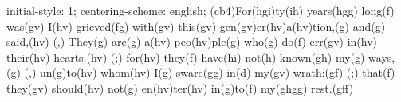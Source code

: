 initial-style: 1;
centering-scheme: english;
(cb4)For(hgi)ty(ih) years(hgg) long(f) was(gv) I(hv) grieved(fg) with(gv) this(gv) gen(gv)er(hv)a(hv)tion,(g) and(g) said,(hv) (,) They(g) are(g) a(hv) peo(hv)ple(g) who(g) do(f) err(gv) in(hv) their(hv) hearts:(hv) (;) for(hv) they(f) have(hi) not(h) known(gh) my(g) ways,(g) (,) un(g)to(hv) whom(hv) I(g) sware(gg) in(d) my(gv) wrath:(gf) (;) that(f) they(gv) should(hv) not(g) en(hv)ter(hv) in(g)to(f) my(ghgg) rest.(gff)
